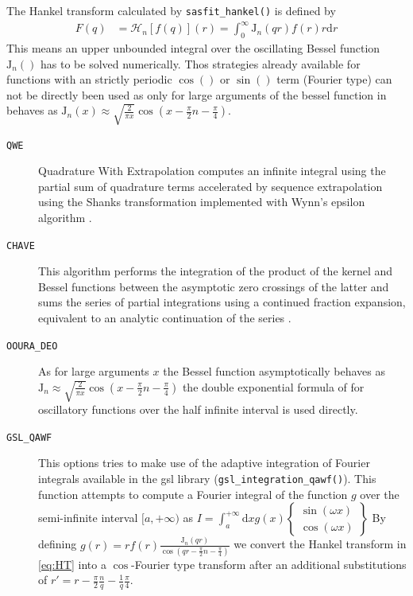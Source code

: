The Hankel transform calculated by \texttt{sasfit\_hankel()} is defined by
\begin{align}\label{eq:HT}
F(q) &= \mathcal{H}_n\left[f(q)\right](r)  = \int_0^\infty \mathrm{J}_n(qr) f(r) r \mathrm{d}r
\end{align}
This means an upper unbounded integral over the oscillating Bessel function $\mathrm{J}_n()$ has to be solved numerically.
Thos strategies already available for functions with an strictly periodic $\cos()$ or $\sin()$ term (Fourier type) can not be directly been used as only for large arguments of the bessel function in behaves as $\mathrm{J}_n(x)\approx \sqrt{\frac{2}{\pi x}}\cos\left(x-\frac{\pi}{2}n-\frac{\pi}{4}\right)$.
\begin{description}
\item[\texttt{QWE}] Quadrature With Extrapolation computes an
infinite integral using the partial sum of quadrature terms
accelerated by sequence extrapolation using the Shanks transformation
implemented with Wynn's epsilon algorithm \cite{Key2012}.
\item[\texttt{CHAVE}]  This algorithm performs the integration of the product of the kernel and Bessel functions between the asymptotic zero crossings of the latter and sums the series of partial integrations using a continued fraction expansion, equivalent to an analytic continuation of the series \cite{Chave1983}.
\item[\texttt{OOURA\_DEO}] As for large arguments $x$ the Bessel function asymptotically behaves as
$\mathrm{J}_n\approx \sqrt{\frac{2}{\pi x}}\cos\left(x-\frac{\pi}{2}n-\frac{\pi}{4}\right)$ the double exponential formula of \cite{Ooura_1991} for oscillatory functions over the half infinite interval is used directly.
\item[\texttt{GSL\_QAWF}] This options tries to make use of the adaptive integration of Fourier integrals available in the gsl library (\texttt{gsl\_integration\_qawf()}). This function attempts to compute a Fourier integral of the function $g$ over the semi-infinite interval $[a,+\infty)$ as
$I = \int_a^{+\infty} \mathrm{d}x g(x)
\left\{
\begin{array}{c}
\sin{(\omega x)} \\
\cos{(\omega x)}
\end{array}
\right\}$
By defining $g(r)= rf(r) \frac{\mathrm{J}_n(qr)}{\cos\left(qr-\frac{\pi}{2}n-\frac{\pi}{4}\right)}$ we convert the Hankel transform in \ref{eq:HT} into a $\cos$-Fourier type transform after an additional substitutions of $r'=r-\frac{\pi}{2}\frac{n}{q}-\frac{1}{q}\frac{\pi}{4}$.
\end{description}

